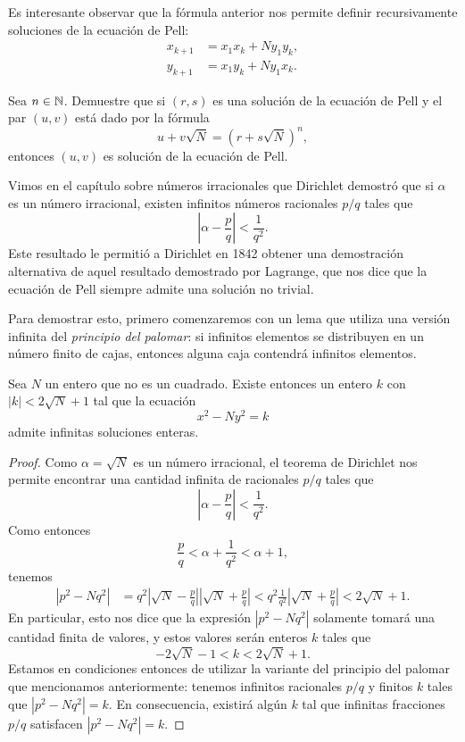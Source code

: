 Es interesante observar que 
la fórmula anterior nos permite definir recursivamente soluciones de la
ecuación de Pell:
\begin{align*}
	x_{k+1} &= x_1x_k+Ny_1y_k,\\
	y_{k+1} &= x_1y_k+Ny_1x_k.
\end{align*}

\begin{exercise}
	Sea $n\in\mathbb{N}$.  Demuestre que si $(r,s)$ es una solución de la ecuación de
	Pell y el par $(u,v)$ está dado por la fórmula 
	\[
		u+v\sqrt{N}=(r+s\sqrt{N})^n,
	\]
	entonces $(u,v)$ es solución de la ecuación de Pell.
\end{exercise}

Vimos en el capítulo sobre números irracionales que Dirichlet demostró que si
$\alpha$ es un número irracional, existen infinitos números racionales $p/q$
tales que
\[
	\left|\alpha-\frac{p}{q}\right|<\frac{1}{q^2}.
\]
Este resultado le permitió a Dirichlet en 1842 obtener una demostración
alternativa de aquel resultado demostrado por Lagrange, que nos dice que la
ecuación de Pell siempre admite una solución no trivial. 

Para demostrar esto, primero comenzaremos con un lema que utiliza una versión
infinita del \emph{principio del palomar}: si infinitos elementos se
distribuyen en un número finito de cajas, entonces alguna caja contendrá
infinitos elementos.

\begin{lemma}
	Sea $N$ un entero que no es un cuadrado.  Existe entonces un entero $k$ con
	$|k|<2\sqrt{N}+1$ tal que la ecuación 
	\[
		x^2-Ny^2=k
	\]
	admite infinitas soluciones enteras. 
\end{lemma}

\begin{proof}
	Como $\alpha=\sqrt{N}$ es un número irracional, el teorema de Dirichlet nos
	permite encontrar una cantidad infinita de racionales $p/q$ tales que
	\[
		\left|\alpha-\frac{p}{q}\right|<\frac{1}{q^2}.
	\]
	Como entonces 
	\[
		\frac{p}{q}<\alpha+\frac{1}{q^{2}}<\alpha+1,
	\]
	tenemos 
	\begin{align*}
		|p^2-Nq^2|&=q^2\left|\sqrt{N}-\frac{p}{q}\right|\left|\sqrt{N}+\frac{p}{q}\right|
		<q^2\frac{1}{q^2}\left|\sqrt{N}+\frac{p}{q}\right|<2\sqrt{N}+1.
	\end{align*}
	En particular, esto nos dice que la expresión $|p^2-Nq^2|$ solamente tomará
	una cantidad finita de valores, y estos valores serán enteros $k$ tales que
	\[
		-2\sqrt{N}-1<k<2\sqrt{N}+1. 
	\]
	Estamos en condiciones entonces de utilizar la variante del principio del
	palomar que mencionamos anteriormente: tenemos infinitos racionales $p/q$ y
	finitos $k$ tales que $|p^2-Nq^2|=k$. En consecuencia, existirá algún $k$
	tal que infinitas fracciones $p/q$ satisfacen $|p^2-Nq^2|=k$.
\end{proof}

